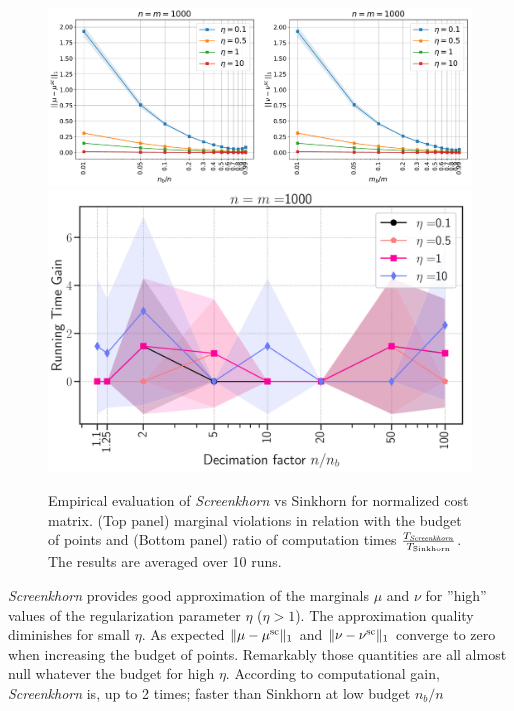 \begin{figure}[t]
	\begin{center}
		\includegraphics[width=14.cm]{../../figure/norm_M_marginals_toy_n1000} \\
		\includegraphics[width=8.cm]{../../figure/norm_M_time_toy_n1000}
	\end{center}
	\caption{Empirical evaluation of \emph{Screenkhorn} vs Sinkhorn for normalized cost matrix. (Top panel) marginal violations in relation with the budget of points and (Bottom panel) ratio of computation times $\frac{T_{\text{\emph{Screenkhorn}}}}{T_{\text{Sinkhorn}}}$. The results are averaged over 10 runs.} 
		\label{fig:margin_expe}
\end{figure}

\emph{Screenkhorn} provides good approximation of the marginals $\mu$ and $\nu$ for ''high'' values of the regularization parameter $\eta$ ($\eta > 1$). The approximation quality diminishes for small $\eta$. As expected $\|{\mu} -{\mu}^{\text{sc}}\|_1$ and $\|{\nu} -{\nu}^{\text{sc}}\|_1$ converge to zero when increasing the budget of points. Remarkably those quantities are all almost null whatever the budget for high $\eta$.  According to computational gain, \emph{Screenkhorn} is, up to 2 times; faster than Sinkhorn at low budget $n_b/n$































